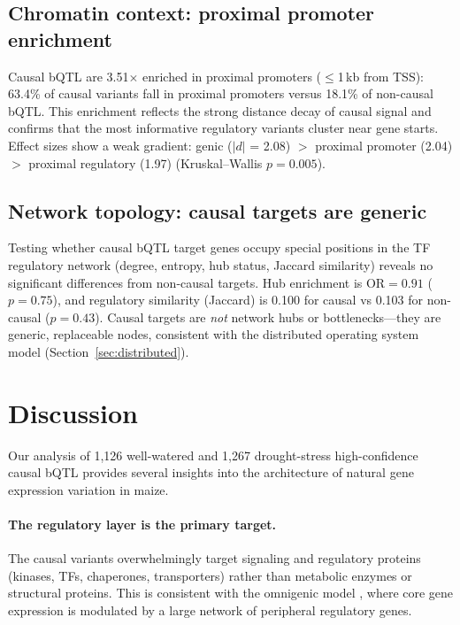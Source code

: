 \documentclass[11pt,a4paper]{article}
\begin{document}
\subsection{Chromatin context: proximal promoter enrichment}
\label{sec:chromatin}

Causal bQTL are 3.51$\times$ enriched in proximal promoters ($\leq$1\,kb
from TSS): 63.4\% of causal variants fall in proximal promoters versus
18.1\% of non-causal bQTL. This enrichment reflects the strong distance
decay of causal signal and confirms that the most informative regulatory
variants cluster near gene starts. Effect sizes show a weak gradient:
genic ($|d|$ = 2.08) $>$ proximal promoter (2.04) $>$ proximal regulatory
(1.97) (Kruskal--Wallis $p = 0.005$).


\subsection{Network topology: causal targets are generic}
\label{sec:topology}

Testing whether causal bQTL target genes occupy special positions in the
TF regulatory network (degree, entropy, hub status, Jaccard similarity)
reveals no significant differences from non-causal targets. Hub enrichment
is $\text{OR} = 0.91$ ($p = 0.75$), and regulatory similarity (Jaccard) is
0.100 for causal vs 0.103 for non-causal ($p = 0.43$). Causal targets are
\emph{not} network hubs or bottlenecks---they are generic, replaceable
nodes, consistent with the distributed operating system model
(Section~\ref{sec:distributed}).


\section{Discussion}

Our analysis of 1,126 well-watered and 1,267 drought-stress high-confidence
causal bQTL provides several insights into the architecture of natural gene
expression variation in maize.

\paragraph{The regulatory layer is the primary target.}
The causal variants overwhelmingly target signaling and regulatory proteins
(kinases, TFs, chaperones, transporters) rather than metabolic enzymes or
structural proteins. This is consistent with the omnigenic model
\citep{boyle2017}, where core gene expression is modulated by a large network
of peripheral regulatory genes.
\end{document}
